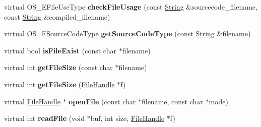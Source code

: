 \begin{DoxyCompactItemize}
\item 
virtual O\+S\+\_\+\+E\+File\+Use\+Type {\bfseries check\+File\+Usage} (const \hyperlink{class_object_script_1_1_o_s_1_1_string}{String} \&sourcecode\+\_\+filename, const \hyperlink{class_object_script_1_1_o_s_1_1_string}{String} \&compiled\+\_\+filename)\hypertarget{class_object_script_1_1_o_s_a6c3724298ba329bb33eeb827b77ec2f7}{}\label{class_object_script_1_1_o_s_a6c3724298ba329bb33eeb827b77ec2f7}

\item 
virtual O\+S\+\_\+\+E\+Source\+Code\+Type {\bfseries get\+Source\+Code\+Type} (const \hyperlink{class_object_script_1_1_o_s_1_1_string}{String} \&filename)\hypertarget{class_object_script_1_1_o_s_a8cc38ea5a8916bbd41ec7d8bdd5f2c74}{}\label{class_object_script_1_1_o_s_a8cc38ea5a8916bbd41ec7d8bdd5f2c74}

\item 
virtual bool {\bfseries is\+File\+Exist} (const char $\ast$filename)\hypertarget{class_object_script_1_1_o_s_aac89ee1f39a55b9aa97b0bdaf980341d}{}\label{class_object_script_1_1_o_s_aac89ee1f39a55b9aa97b0bdaf980341d}

\item 
virtual int {\bfseries get\+File\+Size} (const char $\ast$filename)\hypertarget{class_object_script_1_1_o_s_ace44a7cf987eb1ccf2691b7f16dd340d}{}\label{class_object_script_1_1_o_s_ace44a7cf987eb1ccf2691b7f16dd340d}

\item 
virtual int {\bfseries get\+File\+Size} (\hyperlink{struct_object_script_1_1_o_s_1_1_file_handle}{File\+Handle} $\ast$f)\hypertarget{class_object_script_1_1_o_s_a85d05dbcbb5c5195f9823e5976751e54}{}\label{class_object_script_1_1_o_s_a85d05dbcbb5c5195f9823e5976751e54}

\item 
virtual \hyperlink{struct_object_script_1_1_o_s_1_1_file_handle}{File\+Handle} $\ast$ {\bfseries open\+File} (const char $\ast$filename, const char $\ast$mode)\hypertarget{class_object_script_1_1_o_s_a55abd0ef5b721a750c9c3efa27006d27}{}\label{class_object_script_1_1_o_s_a55abd0ef5b721a750c9c3efa27006d27}

\item 
virtual int {\bfseries read\+File} (void $\ast$buf, int size, \hyperlink{struct_object_script_1_1_o_s_1_1_file_handle}{File\+Handle} $\ast$f)\hypertarget{class_object_script_1_1_o_s_ac1f1470570d5e9357bd35b06fd692dd1}{}\label{class_object_script_1_1_o_s_ac1f1470570d5e9357bd35b06fd692dd1}


\end{DoxyCompactItemize}
